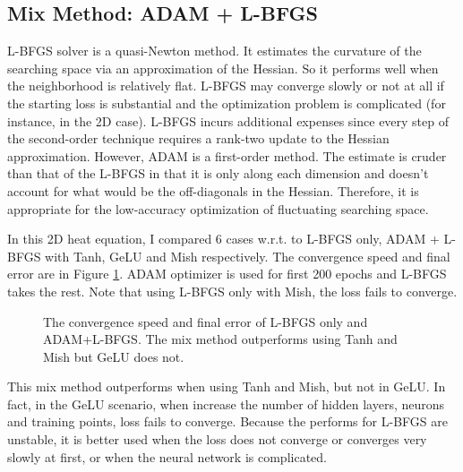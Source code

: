 \documentclass[11pt, a4paper]{article}
\begin{document}
    \subsection{Mix Method: ADAM + L-BFGS}

    L-BFGS solver is a quasi-Newton method. It estimates the curvature of the searching space via an approximation of the Hessian.
    So it performs well when the neighborhood is relatively flat. 
    L-BFGS may converge slowly or not at all if the starting loss is substantial and the optimization problem is complicated (for instance, in the 2D case).
    L-BFGS incurs additional expenses since every step of the second-order technique requires a rank-two update to the Hessian approximation.
    However, ADAM is a first-order method. The estimate is cruder than that of the L-BFGS in that it is only along each dimension and doesn't account for what would be the off-diagonals in the Hessian.
    Therefore, it is appropriate for the low-accuracy optimization of fluctuating searching space.

    In this 2D heat equation, I compared 6 cases w.r.t. to L-BFGS only, ADAM + L-BFGS with Tanh, GeLU and Mish respectively. The convergence speed and final error are in Figure \ref{fig:al}.
    ADAM optimizer is used for first 200 epochs and L-BFGS takes the rest. Note that using L-BFGS only with Mish, the loss fails to converge.

    \begin{figure}[htb]
        \caption{The convergence speed and final error of L-BFGS only and ADAM+L-BFGS. The mix method outperforms using Tanh and Mish but GeLU does not.}
        \label{fig:al}
    \end{figure}

    This mix method outperforms when using Tanh and Mish, but not in GeLU. 
    In fact, in the GeLU scenario, when increase the number of hidden layers, neurons and training points, loss fails to converge. 
    Because the performs for L-BFGS are unstable, it is better used when the loss does not converge or converges very slowly at first, or when the neural network is complicated. 
\end{document}
